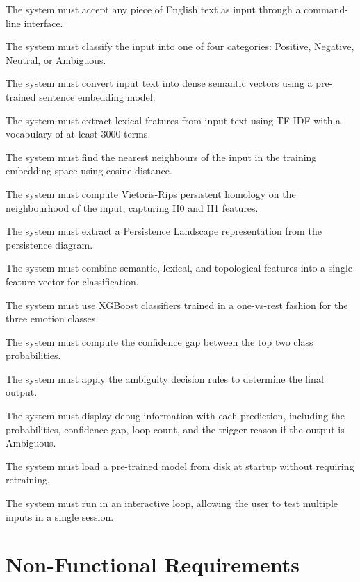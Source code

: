 \begin{description}[leftmargin=2.5cm, style=nextline]
    \item[FR1.] The system must accept any piece of English text as input through a command-line interface.
    \item[FR2.] The system must classify the input into one of four categories: Positive, Negative, Neutral, or Ambiguous.
    \item[FR3.] The system must convert input text into dense semantic vectors using a pre-trained sentence embedding model.
    \item[FR4.] The system must extract lexical features from input text using TF-IDF with a vocabulary of at least 3000 terms.
    \item[FR5.] The system must find the nearest neighbours of the input in the training embedding space using cosine distance.
    \item[FR6.] The system must compute Vietoris-Rips persistent homology on the neighbourhood of the input, capturing H0 and H1 features.
    \item[FR7.] The system must extract a Persistence Landscape representation from the persistence diagram.
    \item[FR8.] The system must combine semantic, lexical, and topological features into a single feature vector for classification.
    \item[FR9.] The system must use XGBoost classifiers trained in a one-vs-rest fashion for the three emotion classes.
    \item[FR10.] The system must compute the confidence gap between the top two class probabilities.
    \item[FR11.] The system must apply the ambiguity decision rules to determine the final output.
    \item[FR12.] The system must display debug information with each prediction, including the probabilities, confidence gap, loop count, and the trigger reason if the output is Ambiguous.
    \item[FR13.] The system must load a pre-trained model from disk at startup without requiring retraining.
    \item[FR14.] The system must run in an interactive loop, allowing the user to test multiple inputs in a single session.
\end{description}

\section{Non-Functional Requirements}

